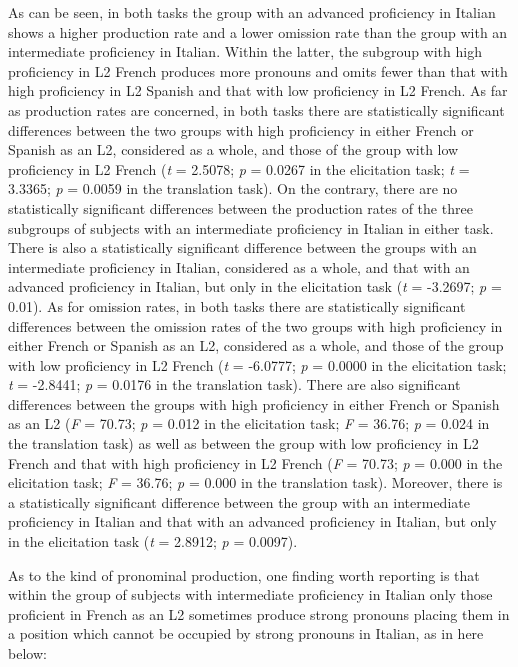 \documentclass[output=paper,modfonts,nonflat,newtxmath]{langsci/langscibook}
\begin{document}
As can be seen, in both tasks the group with an advanced proficiency in Italian shows a higher production rate and a lower omission rate than the group with an intermediate proficiency in Italian. Within the latter, the subgroup with high proficiency in L2 French produces more pronouns and omits fewer than that with high proficiency in L2 Spanish and that with low proficiency in L2 French. As far as production rates are concerned, in both tasks there are statistically significant differences between the two groups with high proficiency in either French or Spanish as an L2, considered as a whole, and those of the group with low proficiency in L2 French (\textit{t} = 2.5078; \textit{p} = 0.0267 in the elicitation task; \textit{t} = 3.3365; \textit{p} = 0.0059 in the translation task). On the contrary, there are no statistically significant differences between the production rates of the three subgroups of subjects with an intermediate proficiency in Italian in either task. There is also a statistically significant difference between the groups with an intermediate proficiency in Italian, considered as a whole, and that with an advanced proficiency in Italian, but only in the elicitation task (\textit{t} = -3.2697; \textit{p} = 0.01). As for omission rates, in both tasks there are statistically significant differences between the omission rates of the two groups with high proficiency in either French or Spanish as an L2, considered as a whole, and those of the group with low proficiency in L2 French (\textit{t} = -6.0777; \textit{p} = 0.0000 in the elicitation task; \textit{t} = -2.8441; \textit{p} = 0.0176 in the translation task). There are also significant differences between the groups with high proficiency in either French or Spanish as an L2 (\textit{F} = 70.73; \textit{p} = 0.012 in the elicitation task; \textit{F} = 36.76; \textit{p} = 0.024 in the translation task) as well as between the group with low proficiency in L2 French and that with high proficiency in L2 French (\textit{F} = 70.73; \textit{p} = 0.000 in the elicitation task; \textit{F} = 36.76; \textit{p} = 0.000 in the translation task). Moreover, there is a statistically significant difference between the group with an intermediate proficiency in Italian and that with an advanced proficiency in Italian, but only in the elicitation task (\textit{t} = 2.8912; \textit{p} = 0.0097).


As to the kind of pronominal production, one finding worth reporting is that within the group of subjects with intermediate proficiency in Italian only those proficient in French as an L2 sometimes produce strong pronouns placing them in a position which cannot be occupied by strong pronouns in Italian, as in  here below:
\end{document}
